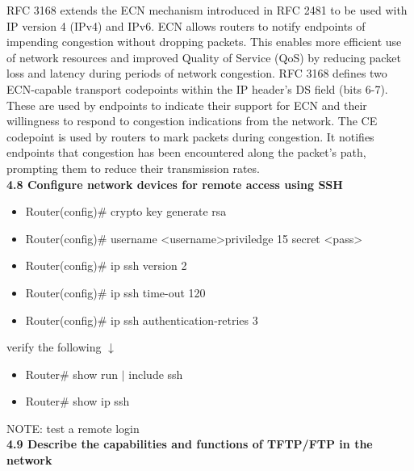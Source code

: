 \documentclass{article}
\begin{document}
	RFC 3168 extends the ECN mechanism introduced in RFC 2481 to be used with IP version 4 (IPv4) and IPv6. ECN allows routers to notify endpoints of impending congestion without dropping packets. This enables more efficient use of network resources and improved Quality of Service (QoS) by reducing packet loss and latency during periods of network congestion. RFC 3168 defines two ECN-capable transport codepoints within the IP header's DS field (bits 6-7). These are used by endpoints to indicate their support for ECN and their willingness to respond to congestion indications from the network. The CE codepoint is used by routers to mark packets during congestion. It notifies endpoints that congestion has been encountered along the packet's path, prompting them to reduce their transmission rates.\\
  
\textbf{4.8 Configure network devices for remote access using SSH}\\
\begin{itemize}
\item Router(config)\# crypto key generate rsa
\item Router(config)\# username \textless username\textgreater priviledge 15 secret \textless pass\textgreater
\item Router(config)\# ip ssh version 2
\item Router(config)\# ip ssh time-out 120
\item Router(config)\# ip ssh authentication-retries 3
\end{itemize}

verify the following $\downarrow$
\begin{itemize}
\item Router\# show run $\mid$ include ssh
\item Router\# show ip ssh
\end{itemize}
		
NOTE: test a remote login\\
  
\textbf{4.9 Describe the capabilities and functions of TFTP/FTP in the network}\\
\end{document}
